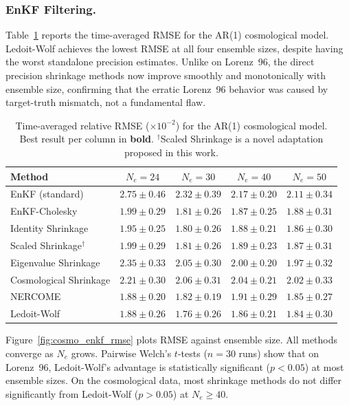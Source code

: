 \subsubsection{EnKF Filtering.}

Table~\ref{tab:cosmo_enkf} reports the time-averaged RMSE for the AR(1) cosmological model. Ledoit-Wolf achieves the lowest RMSE at all four ensemble sizes, despite having the worst standalone precision estimates. Unlike on Lorenz~96, the direct precision shrinkage methods now improve smoothly and monotonically with ensemble size, confirming that the erratic Lorenz~96 behavior was caused by target-truth mismatch, not a fundamental flaw.

\begin{table}[t]
\centering
\caption{Time-averaged relative RMSE ($\times 10^{-2}$) for the AR(1) cosmological model. Best result per column in \textbf{bold}. $^\dagger$Scaled Shrinkage is a novel adaptation proposed in this work.}
\label{tab:cosmo_enkf}
\begin{tabular}{@{}lcccc@{}}
\toprule
Method & $N_e = 24$ & $N_e = 30$ & $N_e = 40$ & $N_e = 50$ \\
\midrule
EnKF (standard)          & $2.75 \pm 0.46$ & $2.32 \pm 0.39$ & $2.17 \pm 0.20$ & $2.11 \pm 0.34$ \\
EnKF-Cholesky            & $1.99 \pm 0.29$ & $1.81 \pm 0.26$ & $1.87 \pm 0.25$ & $1.88 \pm 0.31$ \\
Identity Shrinkage       & $1.95 \pm 0.25$ & $1.80 \pm 0.26$ & $1.88 \pm 0.21$ & $1.86 \pm 0.30$ \\
Scaled Shrinkage$^\dagger$ & $1.99 \pm 0.29$ & $1.81 \pm 0.26$ & $1.89 \pm 0.23$ & $1.87 \pm 0.31$ \\
Eigenvalue Shrinkage     & $2.35 \pm 0.33$ & $2.05 \pm 0.30$ & $2.00 \pm 0.20$ & $1.97 \pm 0.32$ \\
Cosmological Shrinkage   & $2.21 \pm 0.30$ & $2.06 \pm 0.31$ & $2.04 \pm 0.21$ & $2.02 \pm 0.33$ \\
NERCOME                  & $1.88 \pm 0.20$ & $1.82 \pm 0.19$ & $1.91 \pm 0.29$ & $1.85 \pm 0.27$ \\
Ledoit-Wolf              & $\mathbf{1.88 \pm 0.26}$ & $\mathbf{1.76 \pm 0.26}$ & $\mathbf{1.86 \pm 0.21}$ & $\mathbf{1.84 \pm 0.30}$ \\
\bottomrule
\end{tabular}
\end{table}

Figure~\ref{fig:cosmo_enkf_rmse} plots RMSE against ensemble size. All methods converge as $N_e$ grows. Pairwise Welch's $t$-tests ($n = 30$ runs) show that on Lorenz~96, Ledoit-Wolf's advantage is statistically significant ($p < 0.05$) at most ensemble sizes. On the cosmological data, most shrinkage methods do not differ significantly from Ledoit-Wolf ($p > 0.05$) at $N_e \geq 40$.

